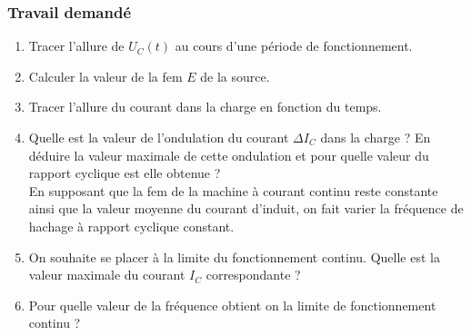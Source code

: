 \subsubsection{Travail demandé}
\begin{enumerate}
\item Tracer l’allure de $U_C(t)$ au cours d’une période de fonctionnement. 
\item Calculer la valeur de la fem $E$ de la source. 
\item Tracer l’allure du courant dans la charge en fonction du temps. 
\item Quelle est la valeur de l’ondulation du courant $\Delta I_C$ dans la charge ? En déduire la valeur maximale de cette ondulation et pour quelle valeur du rapport cyclique est elle obtenue ? \\
En supposant que la fem de la machine à courant continu reste constante ainsi que la valeur moyenne du courant d’induit, on fait varier la fréquence de hachage à rapport cyclique constant.
\item On souhaite se placer à la limite du fonctionnement continu. Quelle est la valeur maximale du courant $I_C$ correspondante ?
\item Pour quelle valeur de la fréquence obtient on la limite de fonctionnement continu ? 
\end{enumerate}



\correction{ %
\begin{enumerate}
\item $U_C=E$ de $0$ à $\alpha.T$, nulle ailleurs;
\item Comme $E'=\alpha E$, on obtient $E=\frac{E'}{\alpha}=125V$; 
\item On suppose à $t=0$, $i_c(t=0)=i_0$. Comme $i_c(t=0)=\frac{1}{L} \int_0^T U_L dt$.\\
Pour $t \in [0,\alpha T[$, $U_L=E'-E=(1-\alpha)E$ d'où \fbox{$i_c(t)=i_0+\frac{(1-\alpha)E}{L}t$}.\\
On a alors \fbox{$i_{max}=i_0+\frac{(1-\alpha)E}{L}T=0,63A$}\\
Pour $t \in [\alpha T, T[$, $U_L=-E'=-\alpha)E$ d'où \fbox{$i_c(t)=i_{max}-\frac{-\alpha E}{L}(t-\alpha T)$}.
\item On en déduit $\Delta I_C=i_{max}-i_0$, \fbox{$\Delta I_C=\frac{1-\alpha}{L}E \alpha T$}\\
L'ondulation est maximale lorsque $\frac{\delta \Delta I_C}{\delta \alpha}=0$ d'où $\alpha=\frac{1}{2}$. Ainsi $\Delta I_{Cmax}=0,625$
\item $\Delta I_C=I_{limite}=2<I_C>$ d'où $I_{limite}=12A$
\item $\Delta I_C=I_{limite}$ implique que $\frac{1-\alpha}{L}E \alpha \frac{1}{f} =I_{limite}$ d'où \fbox{$f=\frac{1-\alpha}{L I_{limite}}E \alpha=85,8kHz$}
\end{enumerate}
}
\newpage

